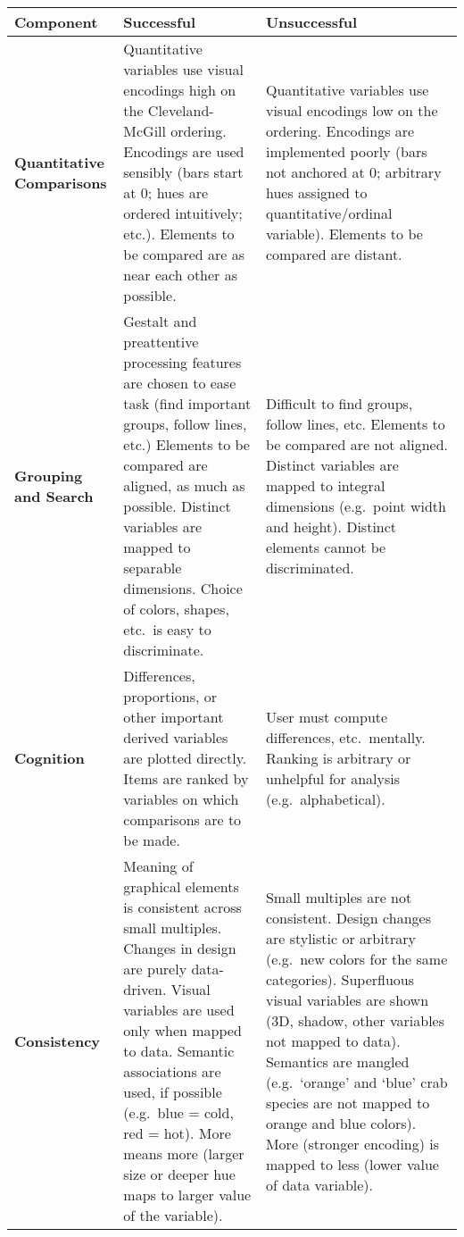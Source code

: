 \documentclass[12pt]{article}
\begin{document}
\begin{table}[h!]
\begin{tabular}{p{1.1in}p{2.55in}p{2.55in}}
\textbf{Component} & \textbf{Successful} & \textbf{Unsuccessful}\\ \hline
\textbf{Quantitative Comparisons} & Quantitative variables use visual encodings high on the Cleveland-McGill ordering. Encodings are used sensibly (bars start at 0; hues are ordered intuitively; etc.). Elements to be compared are as near each other as possible. & Quantitative variables use visual encodings low on the ordering. Encodings are implemented poorly (bars not anchored at 0; arbitrary hues assigned to quantitative/ordinal variable). Elements to be compared are distant. \\ \hline
\textbf{Grouping and Search} & Gestalt and preattentive processing features are chosen to ease task (find important groups, follow lines, etc.) Elements to be compared are aligned, as much as possible. Distinct variables are mapped to separable dimensions. Choice of colors, shapes, etc.\ is easy to discriminate. & Difficult to find groups, follow lines, etc. Elements to be compared are not aligned. Distinct variables are mapped to integral dimensions (e.g.\ point width and height). Distinct elements cannot be discriminated. \\ \hline
\textbf{Cognition} & Differences, proportions, or other important derived variables are plotted directly. Items are ranked by variables on which comparisons are to be made. & User must compute differences, etc.\ mentally. Ranking is arbitrary or unhelpful for analysis (e.g.\ alphabetical). \\ \hline
\textbf{Consistency} & Meaning of graphical elements is consistent across small multiples. Changes in design are purely data-driven. Visual variables are used only when mapped to data. Semantic associations are used, if possible (e.g.\ blue = cold, red = hot). More means more (larger size or deeper hue maps to larger value of the variable). & Small multiples are not consistent. Design changes are stylistic or arbitrary (e.g.\ new colors for the same categories). 
Superfluous visual variables are shown (3D, shadow, other variables not mapped to data). Semantics are mangled (e.g.\ `orange' and `blue' crab species are not mapped to orange and blue colors). More (stronger encoding) is mapped to less (lower value of data variable). \\ \hline
\end{tabular}
\end{table}
\end{document}
